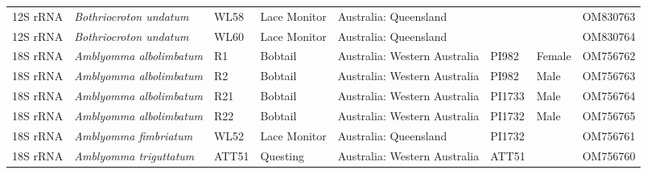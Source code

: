 \documentclass[a4paper, nobind]{templates/ociamthesis}
\begin{document}
\begin{landscape}
\begin{longtable}[t]{l>{}lllllll}
12S rRNA & \em{Bothriocroton undatum} & WL58 & Lace Monitor & Australia: Queensland &  &  & OM830763\\
12S rRNA & \em{Bothriocroton undatum} & WL60 & Lace Monitor & Australia: Queensland &  &  & OM830764\\
18S rRNA & \em{Amblyomma albolimbatum} & R1 & Bobtail & Australia: Western Australia & PI982 & Female & OM756762\\
18S rRNA & \em{Amblyomma albolimbatum} & R2 & Bobtail & Australia: Western Australia & PI982 & Male & OM756763\\
18S rRNA & \em{Amblyomma albolimbatum} & R21 & Bobtail & Australia: Western Australia & PI1733 & Male & OM756764\\
18S rRNA & \em{Amblyomma albolimbatum} & R22 & Bobtail & Australia: Western Australia & PI1732 & Male & OM756765\\
18S rRNA & \em{Amblyomma fimbriatum} & WL52 & Lace Monitor & Australia: Queensland & PI1732 &  & OM756761\\
18S rRNA & \em{Amblyomma triguttatum} & ATT51 & Questing & Australia: Western Australia & ATT51 &  & OM756760\\*
\end{longtable}
\endgroup{}
\end{landscape}

\newpage

\begingroup\fontsize{7.5}{9.5}\selectfont
\end{document}
